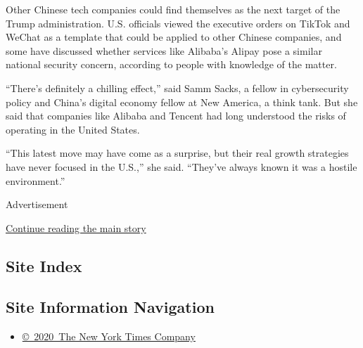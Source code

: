 Other Chinese tech companies could find themselves as the next target of
the Trump administration. U.S. officials viewed the executive orders on
TikTok and WeChat as a template that could be applied to other Chinese
companies, and some have discussed whether services like Alibaba's
Alipay pose a similar national security concern, according to people
with knowledge of the matter.

``There's definitely a chilling effect,'' said Samm Sacks, a fellow in
cybersecurity policy and China's digital economy fellow at New America,
a think tank. But she said that companies like Alibaba and Tencent had
long understood the risks of operating in the United States.

``This latest move may have come as a surprise, but their real growth
strategies have never focused in the U.S.,'' she said. ``They've always
known it was a hostile environment.''

Advertisement

\protect\hyperlink{after-bottom}{Continue reading the main story}

\hypertarget{site-index}{%
\subsection{Site Index}\label{site-index}}

\hypertarget{site-information-navigation}{%
\subsection{Site Information
Navigation}\label{site-information-navigation}}

\begin{itemize}
\tightlist
\item
  \href{https://help.nytimes.com/hc/en-us/articles/115014792127-Copyright-notice}{©~2020~The
  New York Times Company}
\end{itemize}

